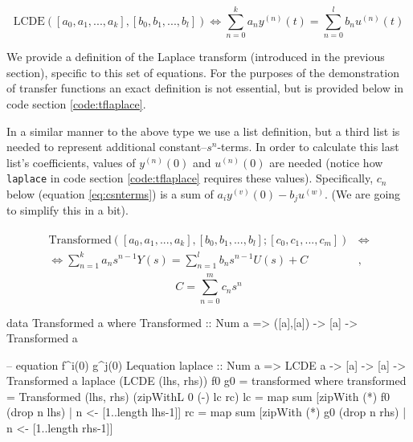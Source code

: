 \begin{equation*}
\text{LCDE}([a_0,a_1,...,a_k],[b_0,b_1,...,b_l]) \iff \sum\limits^{k}_{n=0}{a_n y^{(n)}(t)} = \sum\limits^{l}_{n=0}{b_n u^{(n)}(t)}
\end{equation*}

We provide a definition of the Laplace transform (introduced in the previous section), specific to this set of equations. For the purposes of the demonstration of transfer functions an exact definition is not essential, but is provided below in code section \ref{code:tflaplace}.

In a similar manner to the above type we use a list definition, but a third
list is needed to represent additional constant--$s^n$-terms. %
In order to calculate this last list's coefficients, values of $y^{(n)}(0)$ and $u^{(n)}(0)$ are needed (notice how \texttt{laplace} in code section \ref{code:tflaplace} requires these values). Specifically, $c_n$ below (equation \ref{eq:csnterms}) is a sum of $a_i y^{(v)}(0) - b_j u^{(w)}$.
(We are going to simplify this in a bit).

\begin{align*}\begin{split}%
\text{Transformed}([a_0,a_1,...,a_k],[b_0,b_1,...,b_l];[c_0,c_1,...,c_m]) &\iff\\\iff \sum\limits^{k}_{n=1}{a_n s^{n-1} Y(s)} = \sum\limits^{l}_{n=1}{b_n s^{n-1} U(s)} + C&,
\end{split}\end{align*}
\begin{equation}\label{eq:csnterms}
C = \sum\limits^{m}_{n=0}{c_n s^n}
\end{equation}

\begin{code}[label={code:tflaplace},caption={A data type representing the equation after applying the Laplace transform to its left and right hand sides; A function definition for the Laplace transform of an instance of LCDE. The function \texttt{zipWidthL} referenced works like \texttt{zipWith} but extends the shorter list with the first parameter such that the output has the same length as the longer of the two lists. See appendix \ref{sec:appcodezipwithl} for details.}]
data Transformed a where
  Transformed :: Num a => ([a],[a]) -> [a] -> Transformed a

--                  equation  f^i(0) g^j(0)   L{equation}
laplace :: Num a => LCDE a -> [a] -> [a] -> Transformed a
laplace (LCDE (lhs, rhs)) f0 g0 = transformed where
  transformed = Transformed (lhs, rhs) (zipWithL 0 (-) lc rc)
  lc = map sum [zipWith (*) f0 (drop n lhs) | n <- [1..length lhs-1]]
  rc = map sum [zipWith (*) g0 (drop n rhs) | n <- [1..length rhs-1]]
\end{code}

